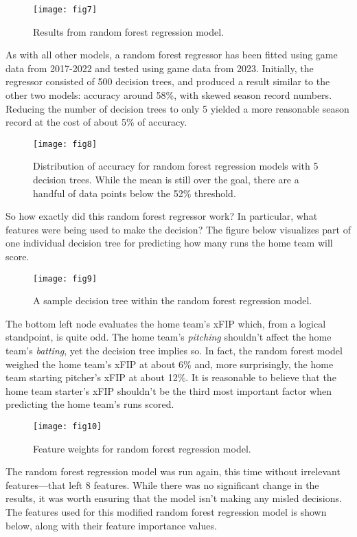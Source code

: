 \documentclass{paper}
\begin{document}
\begin{figure}[H]
  \centering
  \texttt{[image: fig7]}
  \caption{Results from random forest regression model.}
\end{figure}

As with all other models, a random forest regressor has been fitted using game data from 2017-2022 and tested using game data from 2023. Initially, the regressor consisted of 500 decision trees, and produced a result similar to the other two models: accuracy around 58\%, with skewed season record numbers. Reducing the number of decision trees to only 5 yielded a more reasonable season record at the cost of about 5\% of accuracy.

\begin{figure}[H]
  \centering
  \texttt{[image: fig8]}
  \caption{Distribution of accuracy for random forest regression models with 5 decision trees. While the mean is still over the goal, there are a handful of data points below the 52\% threshold.}
\end{figure}

So how exactly did this random forest regressor work? In particular, what features were being used to make the decision? The figure below visualizes part of one individual decision tree for predicting how many runs the home team will score.

\begin{figure}[H]
  \centering
  \texttt{[image: fig9]}
  \caption{A sample decision tree within the random forest regression model.}
\end{figure}

The bottom left node evaluates the home team's xFIP which, from a logical standpoint, is quite odd. The home team's \textit{pitching} shouldn't affect the home team's \textit{batting}, yet the decision tree implies so. In fact, the random forest model weighed the home team's xFIP at about 6\% and, more surprisingly, the home team starting pitcher's xFIP at about 12\%. It is reasonable to believe that the home team starter's xFIP shouldn't be the third most important factor when predicting the home team's runs scored.

\begin{figure}[H]
  \centering
  \texttt{[image: fig10]}
  \caption{Feature weights for random forest regression model.}
\end{figure}

The random forest regression model was run again, this time without irrelevant features---that left 8 features. While there was no significant change in the results, it was worth ensuring that the model isn't making any misled decisions. The features used for this modified random forest regression model is shown below, along with their feature importance values.
\end{document}

